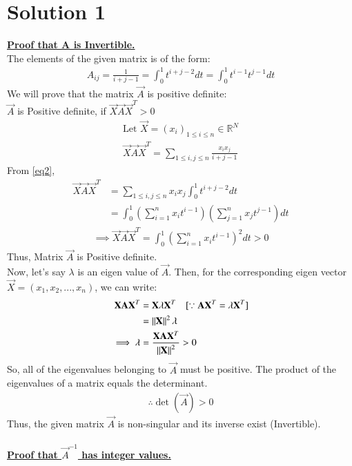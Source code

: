 \documentclass[journal,12pt,twocolumn]{IEEEtran}
\begin{document}
\section{Solution 1}
\underline{\textbf{Proof that A is Invertible.}}\\
The elements of the given matrix is of the form:
\begin{align}
    A_{ij} = \frac{1}{i+j-1}= \int_{0}^{1}t^{i+j-2}dt= \int_{0}^{1}t^{i-1}t^{j-1}dt \label{eq2}
\end{align}
We will prove that the matrix $\vec{A}$ is positive definite:\\
$\vec{A}$ is Positive definite, if $\vec{X}\Vec{A}\vec{X}^T>0$
\begin{align}
   \text{Let } \vec{X}=(x_i)_{1\leq i\leq n} \in \mathbb{R}^N\\
   \vec{X}\Vec{A}\vec{X}^T=\sum_{1\leq i,j\leq n}\frac{x_ix_j}{i+j-1}
\end{align}
From \eqref{eq2},
\begin{align}
   \vec{X}\Vec{A}\vec{X}^T &=\sum_{1\leq i,j\leq n}x_ix_j\int_0^1t^{i+j-2}dt\\
   &=\int_0^1\left(\sum_{i=1}^nx_it^{i-1}\right)\left(\sum_{j=1}^nx_jt^{j-1}\right)dt
\end{align}
\begin{align}
       \implies \vec{X}\Vec{A}\vec{X}^T=\int_0^1\left(\sum_{i=1}^nx_it^{i-1}\right)^2dt>0
\end{align}
Thus, Matrix $\vec{A}$ is Positive definite. \\
Now, let's say $\lambda$ is an eigen value of $\vec{A}$. Then, for the corresponding eigen vector $\vec{X}=(x_1,x_2,...,x_n)$, we can write:
\begin{align}
       \vec{X}\Vec{A}\vec{X}^T&=\vec{X}\lambda\vec{X}^T \quad [\because  \Vec{A}\vec{X}^T=\lambda\vec{X}^T]\\
       &=\norm{\vec{X}}^2\lambda\\
       \implies \lambda&=\frac{\vec{X}\Vec{A}\vec{X}^T}{\norm{\vec{X}}^2}>0
\end{align}
So, all of the eigenvalues belonging to  $\vec{A}$ must be positive. The product of the eigenvalues of a matrix equals the determinant.
\begin{align}
    \boxed{\therefore \det({\vec{A}})>0}
\end{align}
Thus, the given matrix $\vec{A}$ is non-singular and its inverse exist (Invertible).\\ \\
\underline{\textbf{Proof that $\vec{A}^{-1}$ has integer values.}}\\
\end{document}
